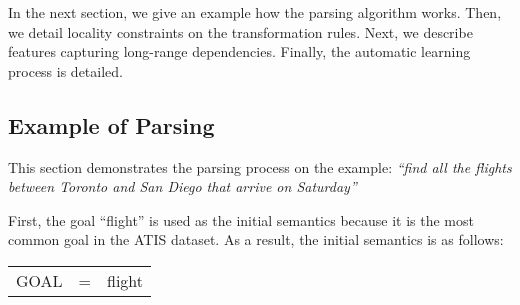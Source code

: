 \documentclass{article}
\begin{document}


In the next section, we give an example how the parsing algorithm works. Then, we detail locality constraints on the transformation rules.
Next, we describe features capturing long-range dependencies.
Finally, the automatic learning process is detailed. 


\subsection{Example of Parsing} \label{sec:example}

This section demonstrates the parsing process on the example: \textit{``find all the flights between Toronto and San Diego that arrive on Saturday''} 

First, the goal ``flight'' is used as the initial semantics because it is the most common goal in the ATIS dataset. As a result, the initial semantics is as follows:

\vspace{.15cm}
\begin{tabular}{lll}
  GOAL & = & flight
\end{tabular} 
\vspace{.15cm}
\end{document}
